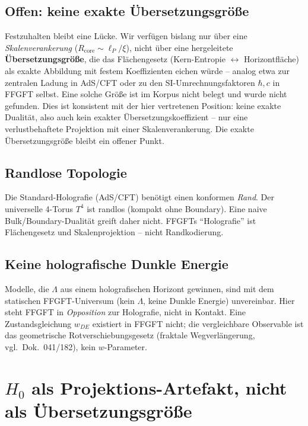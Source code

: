 \subsection*{Offen: keine exakte Übersetzungsgröße}

Festzuhalten bleibt eine Lücke. Wir verfügen bislang nur über eine
\emph{Skalenverankerung} ($R_\text{core} \sim \ell_P/\xi$), nicht über eine
hergeleitete \textbf{Übersetzungsgröße}, die das Flächengesetz
(Kern-Entropie $\leftrightarrow$ Horizontfläche) als exakte Abbildung mit
festem Koeffizienten eichen würde -- analog etwa zur zentralen Ladung in
AdS/CFT oder zu den SI-Umrechnungsfaktoren $\hbar, c$ in FFGFT selbst. Eine
solche Größe ist im Korpus nicht belegt und wurde nicht gefunden. Dies ist
konsistent mit der hier vertretenen Position: keine exakte Dualität, also auch
kein exakter Übersetzungskoeffizient -- nur eine verlustbehaftete Projektion
mit einer Skalenverankerung. Die exakte Übersetzungsgröße bleibt ein offener
Punkt.



\subsection*{Randlose Topologie}

Die Standard-Holografie (AdS/CFT) benötigt einen konformen \emph{Rand}. Der
universelle 4-Torus $T^4$ ist randlos (kompakt ohne Boundary). Eine naive
Bulk/Boundary-Dualität greift daher nicht. FFGFTs \enquote{Holografie} ist
Flächengesetz und Skalenprojektion -- nicht Randkodierung.

\subsection*{Keine holografische Dunkle Energie}

Modelle, die $\Lambda$ aus einem holografischen Horizont gewinnen, sind mit
dem statischen FFGFT-Universum (kein $\Lambda$, keine Dunkle Energie)
unvereinbar. Hier steht FFGFT in \emph{Opposition} zur Holografie, nicht in
Kontakt. Eine Zustandsgleichung $w_{DE}$ existiert in FFGFT nicht; die
vergleichbare Observable ist das geometrische Rotverschiebungsgesetz
(fraktale Wegverlängerung, vgl.\ Dok.~041/182), kein
$w$-Parameter.

\section{\texorpdfstring{$H_0$ als Projektions-Artefakt, nicht als Übersetzungsgröße}{H0 als Projektions-Artefakt, nicht als Uebersetzungsgroesse}}

